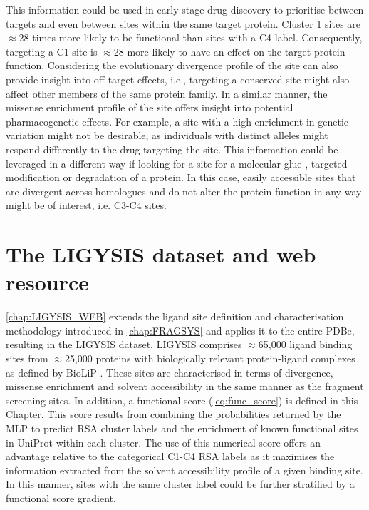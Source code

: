 This information could be used in early-stage drug discovery to prioritise between targets and even between sites within the same target protein. Cluster 1 sites are $\approx$28 times more likely to be functional than sites with a C4 label. Consequently, targeting a C1 site is $\approx$28 more likely to have an effect on the target protein function. Considering the evolutionary divergence profile of the site can also provide insight into off-target effects, i.e., targeting a conserved site might also affect other members of the same protein family. In a similar manner, the missense enrichment profile of the site offers insight into potential pharmacogenetic effects. For example, a site with a high enrichment in genetic variation might not be desirable, as individuals with distinct alleles might respond differently to the drug targeting the site. This information could be leveraged in a different way if looking for a site for a molecular glue \cite{SCHREIBER_2021_GLUES}, targeted modification \cite{BREWER_2024_ATLAS, BREWER_2024_SMAD3, ZHAO_2024_TFEB} or degradation \cite{ZENGERLE_2015_BRD4, GADD_2017_PROTAC} of a protein. In this case, easily accessible sites that are divergent across homologues and do not alter the protein function in any way might be of interest, i.e. C3-C4 sites.

\section{The LIGYSIS dataset and web resource}

\autoref{chap:LIGYSIS_WEB} extends the ligand site definition and characterisation methodology introduced in \autoref{chap:FRAGSYS} and applies it to the entire PDBe, resulting in the LIGYSIS dataset. LIGYSIS comprises $\approx$65,000 ligand binding sites from $\approx$25,000 proteins with biologically relevant protein-ligand complexes as defined by BioLiP \cite{YANG_2013_BIOLIP}. These sites are characterised in terms of divergence, missense enrichment and solvent accessibility in the same manner as the fragment screening sites. In addition, a functional score (\autoref{eq:func_score}) is defined in this Chapter. This score results from combining the probabilities returned by the MLP to predict RSA cluster labels and the enrichment of known functional sites in UniProt \cite{NIGHTINGALE_2017_API} within each cluster. The use of this numerical score offers an advantage relative to the categorical C1-C4 RSA labels as it maximises the information extracted from the solvent accessibility profile of a given binding site. In this manner, sites with the same cluster label could be further stratified by a functional score gradient.

